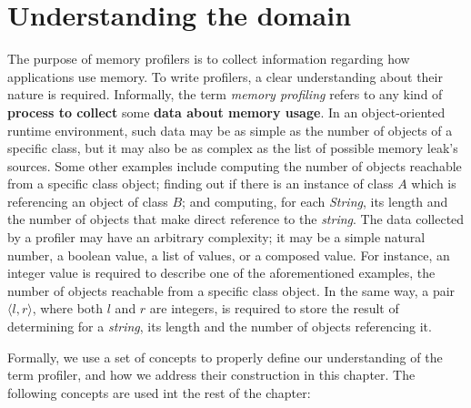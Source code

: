 
\section{Understanding the domain} \label{sec:domain-overview}

The purpose of memory profilers is to collect information regarding how applications use memory.
To write profilers, a clear understanding about their nature is required.
Informally, the term \textit{memory profiling} refers to any kind of \textbf{process to collect} some \textbf{data about memory usage}.
In an object-oriented runtime environment, such data may be as simple as the number of objects of a specific class, but it may also be as complex as the list of possible memory leak's sources.
Some other examples include computing the number of objects reachable from a specific class object; finding out if there is an instance of class $A$ which is referencing an object of class $B$; and computing, for each \textit{String}, its length and the number of objects that make direct reference to the \textit{string}.
The data collected by a profiler may have an arbitrary complexity; it may be a simple natural number, a boolean value, a list of values, or a composed value.
For instance, an integer value is required to describe one of the aforementioned examples, the number of objects reachable from a specific class object.
In the same way, a pair $\langle l,r \rangle$, where both $l$ and $r$ are integers, is required to store the result of determining for a \textit{string}, its length and the number of objects referencing it.


Formally, we use a set of concepts to properly define our understanding of the term profiler, and how we address their construction in this chapter.
The following concepts are used int the rest of the chapter:

